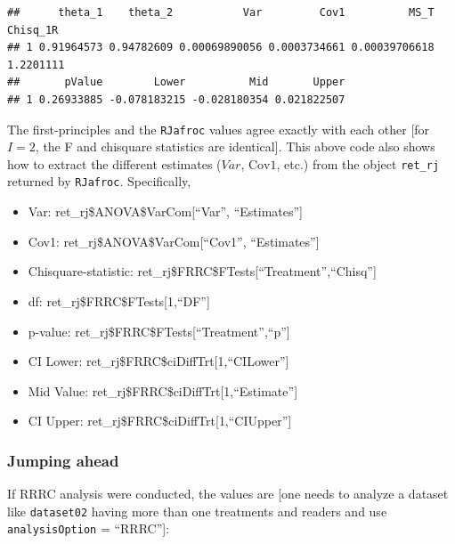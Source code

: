 \documentclass[
]{book}
\providecommand{\tightlist}{%
  \setlength{\itemsep}{0pt}\setlength{\parskip}{0pt}}
\begin{document}
\begin{verbatim}
##      theta_1    theta_2           Var         Cov1          MS_T  Chisq_1R
## 1 0.91964573 0.94782609 0.00069890056 0.0003734661 0.00039706618 1.2201111
##       pValue        Lower          Mid       Upper
## 1 0.26933885 -0.078183215 -0.028180354 0.021822507
\end{verbatim}

The first-principles and the \texttt{RJafroc} values agree exactly with each other {[}for \(I = 2\), the F and chisquare statistics are identical{]}. This above code also shows how to extract the different estimates (\(Var\), \(\text{Cov1}\), etc.) from the object \texttt{ret\_rj} returned by \texttt{RJafroc}. Specifically,

\begin{itemize}
\tightlist
\item
  Var: ret\_rj\$ANOVA\$VarCom{[}``Var'', ``Estimates''{]}
\item
  Cov1: ret\_rj\$ANOVA\$VarCom{[}``Cov1'', ``Estimates''{]}
\item
  Chisquare-statistic: ret\_rj\$FRRC\$FTests{[}``Treatment'',``Chisq''{]}
\item
  df: ret\_rj\$FRRC\$FTests{[}1,``DF''{]}
\item
  p-value: ret\_rj\$FRRC\$FTests{[}``Treatment'',``p''{]}
\item
  CI Lower: ret\_rj\$FRRC\$ciDiffTrt{[}1,``CILower''{]}
\item
  Mid Value: ret\_rj\$FRRC\$ciDiffTrt{[}1,``Estimate''{]}
\item
  CI Upper: ret\_rj\$FRRC\$ciDiffTrt{[}1,``CIUpper''{]}
\end{itemize}

\hypertarget{jumping-ahead}{%
\subsubsection{Jumping ahead}\label{jumping-ahead}}

If RRRC analysis were conducted, the values are {[}one needs to analyze a dataset like \texttt{dataset02} having more than one treatments and readers and use \texttt{analysisOption} = ``RRRC''{]}:
\end{document}
